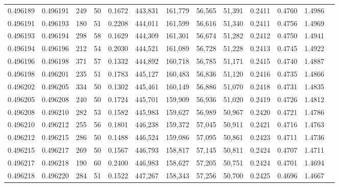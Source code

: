 \begin{tabular}{rrrrrrrrrrrrr}
0.496189 & 0.496191 &   249 &  50 &                                     0.1672 & 443,831 & 161,779 &  56,565 &  51,391 & 0.2411 & 0.4760 & 1.4986 \\
0.496191 & 0.496193 &   180 &  51 &                                     0.2208 & 444,011 & 161,599 &  56,616 &  51,340 & 0.2411 & 0.4756 & 1.4969 \\
0.496193 & 0.496194 &   298 &  58 &                                     0.1629 & 444,309 & 161,301 &  56,674 &  51,282 & 0.2412 & 0.4750 & 1.4941 \\
0.496194 & 0.496196 &   212 &  54 &                                     0.2030 & 444,521 & 161,089 &  56,728 &  51,228 & 0.2413 & 0.4745 & 1.4922 \\
0.496196 & 0.496198 &   371 &  57 &                                     0.1332 & 444,892 & 160,718 &  56,785 &  51,171 & 0.2415 & 0.4740 & 1.4887 \\
0.496198 & 0.496201 &   235 &  51 &                                     0.1783 & 445,127 & 160,483 &  56,836 &  51,120 & 0.2416 & 0.4735 & 1.4866 \\
0.496202 & 0.496205 &   334 &  50 &                                     0.1302 & 445,461 & 160,149 &  56,886 &  51,070 & 0.2418 & 0.4731 & 1.4835 \\
0.496205 & 0.496208 &   240 &  50 &                                     0.1724 & 445,701 & 159,909 &  56,936 &  51,020 & 0.2419 & 0.4726 & 1.4812 \\
0.496208 & 0.496210 &   282 &  53 &                                     0.1582 & 445,983 & 159,627 &  56,989 &  50,967 & 0.2420 & 0.4721 & 1.4786 \\
0.496210 & 0.496212 &   255 &  56 &                                     0.1801 & 446,238 & 159,372 &  57,045 &  50,911 & 0.2421 & 0.4716 & 1.4763 \\
0.496212 & 0.496215 &   286 &  50 &                                     0.1488 & 446,524 & 159,086 &  57,095 &  50,861 & 0.2423 & 0.4711 & 1.4736 \\
0.496215 & 0.496217 &   269 &  50 &                                     0.1567 & 446,793 & 158,817 &  57,145 &  50,811 & 0.2424 & 0.4707 & 1.4711 \\
0.496217 & 0.496218 &   190 &  60 &                                     0.2400 & 446,983 & 158,627 &  57,205 &  50,751 & 0.2424 & 0.4701 & 1.4694 \\
0.496218 & 0.496220 &   284 &  51 &                                     0.1522 & 447,267 & 158,343 &  57,256 &  50,700 & 0.2425 & 0.4696 & 1.4667 \\

\end{tabular}
